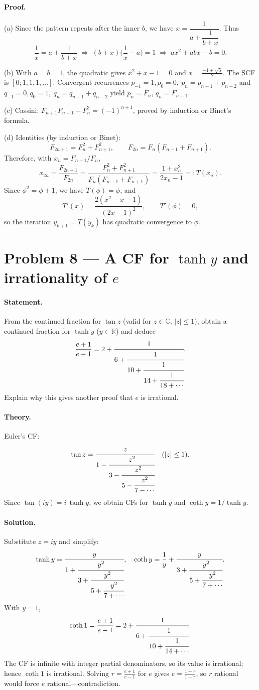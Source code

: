 \documentclass[12pt,a4paper]{article}
\theoremstyle{plain}
\theoremstyle{definition}
\theoremstyle{remark}
\theoremstyle{remark}
\begin{document}
\paragraph{Proof.}
(a) Since the pattern repeats after the inner $b$, we have $x=\dfrac{1}{a+\dfrac{1}{b+x}}$.
Thus
\[
\frac{1}{x}=a+\frac{1}{b+x}\;\Longrightarrow\;
(b+x)\Big(\frac{1}{x}-a\Big)=1
\;\Longrightarrow\; a x^2 + a b x - b=0.
\]

(b) With $a=b=1$, the quadratic gives $x^2+x-1=0$ and $x=\tfrac{-1+\sqrt5}{2}$.
The SCF is $[0;1,1,1,\ldots]$. Convergent recurrences
$p_{-1}=1,p_0=0,\ p_n=p_{n-1}+p_{n-2}$ and
$q_{-1}=0,q_0=1,\ q_n=q_{n-1}+q_{n-2}$ yield $p_n=F_n$, $q_n=F_{n+1}$.

(c) Cassini: $F_{n+1}F_{n-1}-F_n^2=(-1)^{n+1}$, proved by induction or Binet’s formula.

(d) Identities (by induction or Binet):
\[
F_{2n+1}=F_n^2+F_{n+1}^2,\qquad F_{2n}=F_n(F_{n-1}+F_{n+1}).
\]
Therefore, with $x_n=F_{n+1}/F_n$,
\[
x_{2n}=\frac{F_{2n+1}}{F_{2n}}
=\frac{F_n^2+F_{n+1}^2}{F_n(F_{n-1}+F_{n+1})}
=\frac{1+x_n^2}{2x_n-1}=:T(x_n).
\]
Since $\phi^2=\phi+1$, we have $T(\phi)=\phi$, and
\[
T'(x)=\frac{2(x^2-x-1)}{(2x-1)^2},\qquad T'(\phi)=0,
\]
so the iteration $y_{k+1}=T(y_k)$ has quadratic convergence to $\phi$.

\section*{Problem 8 — A CF for $\tanh y$ and irrationality of $e$}

\paragraph{Statement.}
From the continued fraction for $\tan z$ (valid for $z\in\mathbb C$, $|z|\le 1$), obtain a continued fraction for $\tanh y$ ($y\in\mathbb R$) and deduce
\[
\frac{e+1}{e-1}=2+\cfrac{1}{6+\cfrac{1}{10+\cfrac{1}{14+\cfrac{1}{18+\cdots}}}}.
\]
Explain why this gives another proof that $e$ is irrational.

\paragraph{Theory.}
Euler’s CF:
\[
\tan z=\cfrac{z}{1-\cfrac{z^{2}}{3-\cfrac{z^{2}}{5-\cfrac{z^{2}}{7-\cdots}}}}
\quad (|z|\le1).
\]
Since $\tan(i y)= i\,\tanh y$, we obtain CFs for $\tanh y$ and $\coth y=1/\tanh y$.

\paragraph{Solution.}
Substitute $z=i y$ and simplify:
\[
\tanh y=\cfrac{y}{1+\cfrac{y^{2}}{3+\cfrac{y^{2}}{5+\cfrac{y^{2}}{7+\cdots}}}},
\quad
\coth y=\frac{1}{y}+\cfrac{y}{3+\cfrac{y^{2}}{5+\cfrac{y^{2}}{7+\cdots}}}.
\]
With $y=1$,
\[
\coth 1=\frac{e+1}{e-1}
=2+\cfrac{1}{6+\cfrac{1}{10+\cfrac{1}{14+\cdots}}}.
\]
The CF is infinite with integer partial denominators, so its value is irrational; hence
$\coth 1$ is irrational. Solving $r=\frac{e+1}{e-1}$ for $e$ gives $e=\frac{1+r}{1-r}$,
so $r$ rational would force $e$ rational—contradiction.
\end{document}
